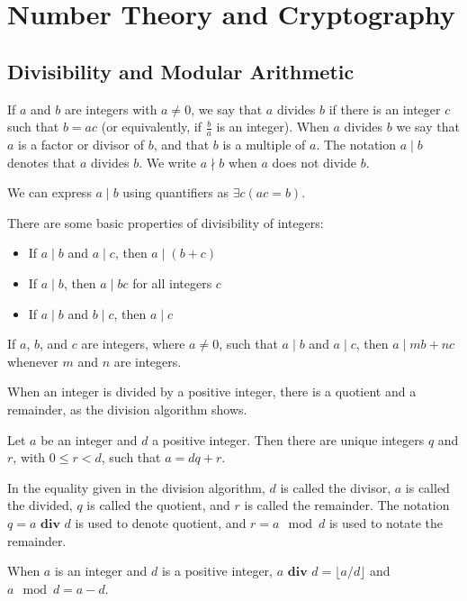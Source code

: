 \documentclass[../discrete.tex]{subfiles}
\begin{document}
\chapter{Number Theory and Cryptography}
\section{Divisibility and Modular Arithmetic}
\begin{definition}
    If $a$ and $b$ are integers with $a\neq 0$, we say that $a$ divides $b$ if there is an integer $c$
    such that $b=ac$ (or equivalently, if $\frac{b}{a}$ is an integer). When $a$ divides $b$ we say that $a$
    is a factor or divisor of $b$, and that $b$ is a multiple of $a$. The notation $a\mid b$ denotes that $a$ divides $b$.
    We write $a\nmid b$ when $a$ does not divide $b$.
\end{definition}
We can express $a\mid b$ using quantifiers as $\exists c(ac=b)$.

There are some basic properties of divisibility of integers:
\begin{itemize}
    \item If $a\mid b$ and $a\mid c$, then $a\mid (b+c)$
    \item If $a\mid b$, then $a\mid bc$ for all integers $c$
    \item If $a\mid b$ and $b\mid c$, then $a\mid c$
\end{itemize}

\begin{corollary}
    If $a$, $b$, and $c$ are integers, where $a\neq 0$, such that $a\mid b$ and $a\mid c$,
    then $a\mid mb + nc$ whenever $m$ and $n$ are integers.
\end{corollary}

When an integer is divided by a positive integer, there is a quotient and a remainder, as the division algorithm shows.
\begin{theorem}
    Let $a$ be an integer and $d$ a positive integer. Then there are unique integers $q$ and $r$, with $0\leq r < d$, such that $a=dq+r$.
\end{theorem}

In the equality given in the division algorithm, $d$ is called the divisor, $a$ is called the divided,
$q$ is called the quotient, and $r$ is called the remainder. The notation $q=a \textbf{ div } d$ is used to denote 
quotient, and $r=a\mod d$ is used to notate the remainder.

When $a$ is an integer and $d$ is a positive integer, $a \textbf{ div } d = \lfloor a/d \rfloor$ and $a\mod d = a-d$.
\end{document}
